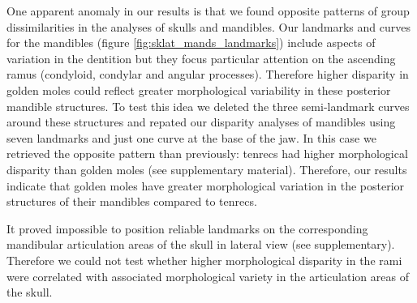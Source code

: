 \documentclass[12pt,a4paper]{article}
\begin{document}
	
	One apparent anomaly in our results is that we found opposite patterns of group dissimilarities in the analyses of skulls and mandibles. 
	Our landmarks and curves for the mandibles (figure \ref{fig:sklat_mands_landmarks}) include aspects of variation in the dentition but they focus particular attention on the ascending ramus (condyloid, condylar and angular processes). Therefore higher disparity in golden moles could reflect greater morphological variability in these posterior mandible structures. To test this idea we deleted the three semi-landmark curves around these structures and repated our disparity analyses of mandibles using seven landmarks and just one curve at the base of the jaw. In this case we retrieved the opposite pattern than previously: tenrecs had higher morphological disparity than golden moles (see supplementary material). Therefore, our results indicate that golden moles have greater morphological variation in the posterior structures of their mandibles compared to tenrecs.
	
		
 	It proved impossible to position reliable landmarks on the corresponding mandibular articulation areas of the skull in lateral view (see supplementary). Therefore we could not test whether higher morphological disparity in the rami were correlated with associated morphological variety in the articulation areas of the skull.
	
	

\end{document}
